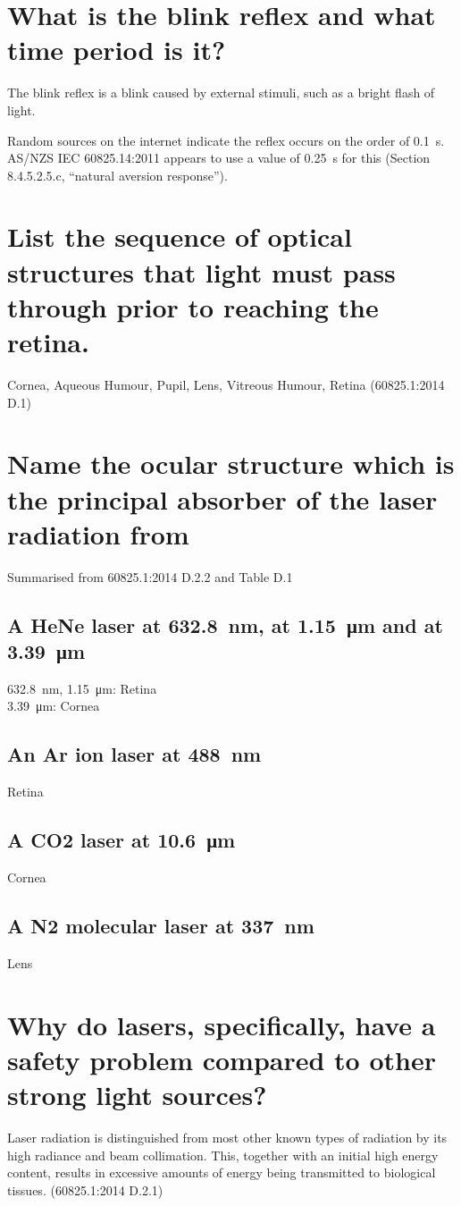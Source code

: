 \documentclass[a4paper]{scrartcl}
\begin{document}
\section{What is the blink reflex and what time period is it?}
The blink reflex is a blink caused by external stimuli, such as a bright flash of light.

Random sources on the internet indicate the reflex occurs on the order of \SI{0.1}{\second}. AS/NZS IEC 60825.14:2011 appears to use a value of \SI{0.25}{\second} for this (Section 8.4.5.2.5.c, ``natural aversion response'').

\section{List the sequence of optical structures that light must pass through prior to reaching the retina.}
Cornea, Aqueous Humour, Pupil, Lens, Vitreous Humour, Retina (60825.1:2014 D.1)

\section{Name the ocular structure which is the principal absorber of the laser radiation from}
Summarised from 60825.1:2014 D.2.2 and Table D.1

\subsection{A HeNe laser at \SI{632.8}{\nano\metre}, at \SI{1.15}{\micro\metre} and at \SI{3.39}{\micro\metre}}
\SI{632.8}{\nano\metre}, \SI{1.15}{\micro\metre}: Retina \\
\SI{3.39}{\micro\metre}: Cornea

\subsection{An Ar ion laser at \SI{488}{\nano\metre}}
Retina

\subsection{A CO2 laser at \SI{10.6}{\micro\metre}}
Cornea

\subsection{A N2 molecular laser at \SI{337}{\nano\metre}}
Lens

\section{Why do lasers, specifically, have a safety problem compared to other strong light sources?}
Laser radiation is distinguished from most other known types of radiation by its high radiance and beam collimation. This, together with an initial high energy content, results in excessive amounts of energy being transmitted to biological tissues. (60825.1:2014 D.2.1)
\end{document}
